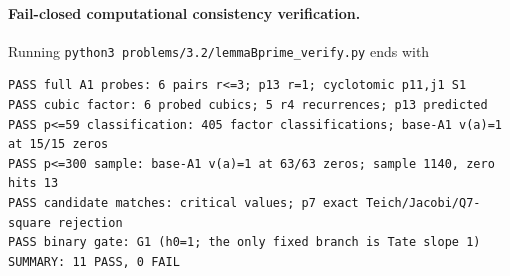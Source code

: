 \paragraph{Fail-closed computational consistency verification.}
Running \texttt{python3 problems/3.2/lemmaBprime\_verify.py} ends with
\begingroup\scriptsize
\begin{verbatim}
PASS full A1 probes: 6 pairs r<=3; p13 r=1; cyclotomic p11,j1 S1
PASS cubic factor: 6 probed cubics; 5 r4 recurrences; p13 predicted
PASS p<=59 classification: 405 factor classifications; base-A1 v(a)=1 at 15/15 zeros
PASS p<=300 sample: base-A1 v(a)=1 at 63/63 zeros; sample 1140, zero hits 13
PASS candidate matches: critical values; p7 exact Teich/Jacobi/Q7-square rejection
PASS binary gate: G1 (h0=1; the only fixed branch is Tate slope 1)
SUMMARY: 11 PASS, 0 FAIL
\end{verbatim}
\endgroup
